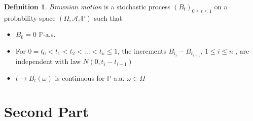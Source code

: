 \documentclass[12pt,a4paper]{report}
\theoremstyle{definition}
\newtheorem{definition}{Definition}
\begin{document}
\begin{appendix}



\begin{definition}\parencite{karatzas1991brownian}
	\textit{Brownian motion} is a stochastic process $(B_t)_{0\leq t\leq1}$ on a probability space $(\Omega, \mathcal{A}, \mathbb{P})$ such that	
	\begin{itemize}
		\item $B_0 = 0$ $\mathbb{P}$-a.s.
		\item For $0 = t_0 < t_1 < t_2 < ...< t_n \leq 1$, the increments $B_{t_i} - B_{t_{i-1}}$, $1 \leq i \leq n$ , are independent with law $N(0, t_i - t_{i-1})$
		\item $t \rightarrow B_t(\omega)$ is continuous for $\mathbb{P}$-a.a. $\omega \in \Omega$
	\end{itemize} 
\end{definition}

	
	\section{Second Part}

	
\end{appendix}



\listoffigures

\printbibliography
\end{document}
